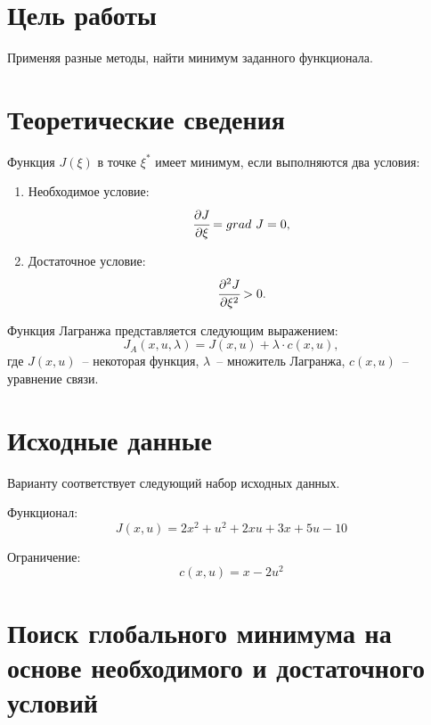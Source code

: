 \section{Цель работы}
Применяя разные методы, найти минимум заданного функционала.


\section{Теоретические сведения}

Функция $J(\xi)$ в точке $\xi^*$ имеет минимум, если выполняются два условия:
\begin{enumerate}
	\item Необходимое условие:
	\begin{equation}\label{need_condition}
	\cfrac{\partial{J}}{\partial{\xi}} = grad~J = 0,
	\end{equation}
	\item Достаточное условие:
	\begin{equation}\label{must_condition}
	\cfrac{\partial^2 J}{\partial{\xi^2}} > 0.
	\end{equation}
\end{enumerate}

Функция Лагранжа представляется следующим выражением:
\begin{equation}
	J_A(x,u,\lambda) = J(x,u) + \lambda \cdot c(x,u),
\end{equation}
где $J(x,u)$~-- некоторая функция, $\lambda$~-- множитель Лагранжа, $c(x, u)$~-- уравнение связи.

\section{Исходные данные}
Варианту  соответствует следующий набор исходных данных. 

Функционал:
\begin{equation}\label{functional}
    J(x, u) = 2 x^2 + u^2 + 2 x u + 3 x + 5 u - 10 
\end{equation}

Ограничение:
\begin{equation}\label{condition}
	c(x, u) = x - 2 u ^2
\end{equation}


\vspace{0.3cm}
\section{Поиск глобального минимума на основе необходимого и достаточного условий}
